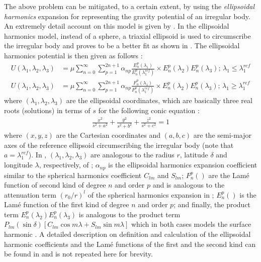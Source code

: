 \FloatBarrier
The above problem can be mitigated, to a certain extent, by using the \textit{ellipsoidal harmonics} expansion for representing the gravity potential of an irregular body. An extremely detail account on this model is given by \cite{dechambre2002transformation}. In the ellipsoidal harmonics model, instead of a sphere, a triaxial ellipsoid is used to circumscribe the irregular body and proves to be a better fit as shown in . The ellipsoidal harmonics potential is then given as follows \parencite{dechambre2002transformation}:
\begin{align}
    U(\lambda_1, \lambda_2, \lambda_3) &= \mu \sum_{n=0}^{\infty} \sum_{p=1}^{2n+1} \alpha_{np} \frac{E_n^p(\lambda_1)}{E_n^p(\lambda_1^{ref})} \times E_n^p(\lambda_2) E_n^p(\lambda_3) \text{; $\lambda_1 \leq \lambda_1^{ref}$}
    \label{eqn:ellipsoidal_harmonics_inside} \\
    U(\lambda_1, \lambda_2, \lambda_3) &= \mu \sum_{n=0}^{\infty} \sum_{p=1}^{2n+1} \alpha_{np} \frac{F_n^p(\lambda_1)}{F_n^p(\lambda_1^{ref})} \times E_n^p(\lambda_2) E_n^p(\lambda_3) \text{; $\lambda_1 \geq \lambda_1^{ref}$}
    \label{eqn:ellipsoidal_harmonics_outside}
\end{align}
where $(\lambda_1, \lambda_2, \lambda_3)$ are the ellipsoidal coordinates, which are basically three real roots (solutions) in terms of $s$ for the following conic equation \parencite{garmier2002modeling}:
\begin{align}
    \frac{x^2}{s^2 + a^2} + \frac{y^2}{s^2 + b^2} + \frac{z^2}{s^2 + c^2} = 1
    \label{eqn:conic_ellipsoidal}
\end{align}
where $(x, y, z)$ are the Cartesian coordinates and $(a, b, c)$ are the semi-major axes of the reference ellipsoid circumscribing the irregular body (note that $a=\lambda_1^{ref}$). In , $(\lambda_1, \lambda_2, \lambda_3)$ are analogous to the radius $r$, latitude $\delta$ and longitude $\lambda$, respectively, of ; $\alpha_{np}$ is the ellipsoidal harmonics expansion coefficient similar to the spherical harmonics coefficient $C_{lm}$ and $S_{lm}$; $F_n^p()$ are the Lam\'e function of second kind of degree $n$ and order $p$ and is analogous to the attenuation term $(r_0 / r)^l$ of the spherical harmonics expansion in ; $E_{n}^p()$ is the Lam\'e function of the first kind of degree $n$ and order $p$; and finally, the product term $E_{n}^p(\lambda_2)E_{n}^p(\lambda_3)$ is analogous to the product term $P_{lm} (\sin\delta) [C_{lm}\cos m\lambda + S_{lm}\sin m\lambda]$ which in both cases models the surface harmonic \parencite{garmier2002modeling}. A detailed description on definition and calculation of the ellipsoidal harmonic coefficients and the Lam\'e functions of the first and the second kind can be found in \cite{dechambre2002transformation} and is not repeated here for brevity.

